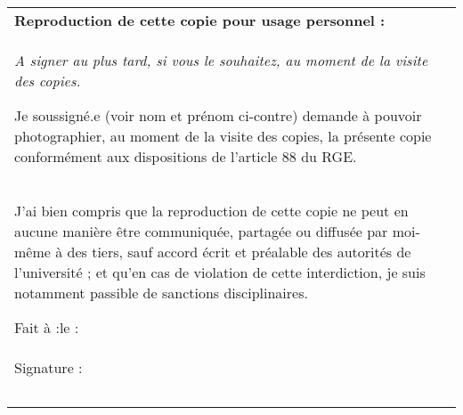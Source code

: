 \begin{tabular}{|p{\textwidth}|}\hline
\small \textbf{Reproduction de cette copie pour usage personnel :} \\

\footnotesize
\textit{A signer au plus tard, si vous le souhaitez, au moment de la visite des copies.}

Je soussigné.e (voir nom et prénom ci-contre) demande à pouvoir photographier, au moment de la visite des copies, la présente copie conformément aux dispositions de l’article 88 du RGE. \\

\footnotesize
J’ai bien compris que la reproduction de cette copie ne peut en aucune manière être communiquée, partagée ou diffusée par moi-même à des tiers, sauf accord écrit et préalable des autorités de l’université ; et qu’en cas de violation de cette interdiction, je suis notamment passible de sanctions disciplinaires.

Fait à :\hspace*{3cm}le :\\ 

\footnotesize
Signature :\\ 
~\\ \hline
\end{tabular}